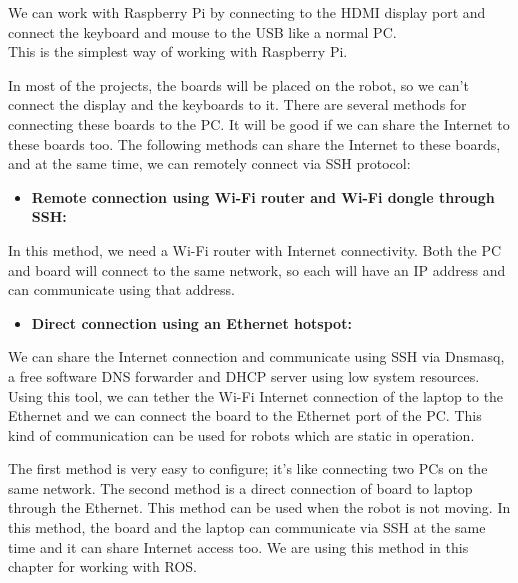 We can work with Raspberry Pi  by connecting to the HDMI display port and connect the keyboard and mouse to the USB like a normal PC.\\
This is the simplest way of working with Raspberry Pi.

In most of the projects, the boards will be placed on the robot, so we can't connect the display and the keyboards to it. There are several methods for connecting these boards to the PC. 
It will be good if we can share the Internet to these boards too. The following methods can share the Internet to these boards, and at the same time, we can remotely connect via SSH protocol:

\begin{itemize}
	\item \textbf{Remote connection using Wi-Fi router and Wi-Fi dongle through SSH:}
\end{itemize}
In this method, we need a Wi-Fi router with Internet connectivity. 
Both the PC and board will connect to the same network, so each will have an IP address and can communicate using that address.

\begin{itemize}
	\item \textbf{Direct connection using an Ethernet hotspot:}
\end{itemize}

We can share the Internet connection and communicate using SSH via Dnsmasq, a free software DNS forwarder and DHCP server using low system resources. Using this tool, we can tether the Wi-Fi Internet connection of the laptop to the Ethernet and we can connect the board to the Ethernet port of the PC. This kind of communication can be used for robots which are static in operation.

The first method is very easy to configure; it's like connecting two PCs on the same network. 
The second method is a direct connection of board to laptop through the Ethernet. This method can be used when the robot is not moving.
In this method, the board and the laptop can communicate via SSH at the same time and it can share 
Internet access too. We are using this method in this chapter for working with ROS.

